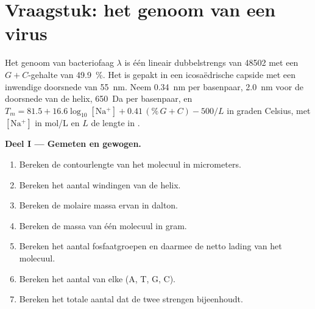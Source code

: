 \section{Vraagstuk: het genoom van een virus}

\begin{problem}
\label{pb:b1:nucleic-acids:1}
Het genoom van bacteriofaag $\lambda$ is één lineair dubbelstrengs  van
\num{48502}  met een $G + C$-gehalte van \qty{49.9}{\%}. Het is gepakt
in een icosaëdrische capside met een inwendige doorsnede van \qty{55}{nm}. Neem
\qty{0.34}{nm} per basenpaar, \qty{2.0}{nm} voor de doorsnede van de helix,
\qty{650}{Da} per basenpaar, en $T_m = 81.5 + 16.6\log_{10}[\mathrm{Na^+}]
+ 0.41\,(\%\,G{+}C) - 500/L$ in graden Celsius, met $[\mathrm{Na^+}]$ in
\unit{mol/L} en $L$ de lengte in .

\medskip
\noindent\textbf{Deel I --- Gemeten en gewogen.}
\begin{enumerate}
  \item Bereken de contourlengte van het molecuul in micrometers.
  \item Bereken het aantal windingen van de helix.
  \item Bereken de molaire massa ervan in dalton.
  \item Bereken de massa van één molecuul in gram.
  \item Bereken het aantal fosfaatgroepen en daarmee de netto lading van
        het molecuul.
  \item Bereken het aantal  van elke  (A, T, G, C).
  \item Bereken het totale aantal  dat de twee strengen
        bijeenhoudt.
\end{enumerate}


\end{problem}

